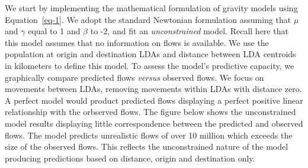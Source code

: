 \documentclass[
  a4paper, 
  twoside,
  final
]{article}
\begin{document}
We start by implementing the mathematical formulation of gravity models
using Equation~\ref{eq-1}. We adopt the standard Newtonian formulation
assuming that \(\mu\) and \(\gamma\) equal to 1 and \(\beta\) to -2, and
fit an \emph{unconstrained} model. Recall here that this model assumes
that no information on flows is available. We use the population at
origin and destination LDAs and distance between LDA centroids in
kilometers to define this model. To assess the model's predictive
capacity, we graphically compare predicted flows \emph{versus} observed
flows. We focus on movements between LDAs, removing movements within
LDAs with distance zero. A perfect model would product predicted flows
displaying a perfect positive linear relationship with the orbserved
flows. The figure below shows the unconstrained model results displaying
little correspondence between the predicted and observed flows. The
model predicts unrealistic flows of over 10 million which exceeds the
size of the observed flows. This reflects the unconstrained nature of
the model producing predictions based on distance, origin and
destination only.
\end{document}
